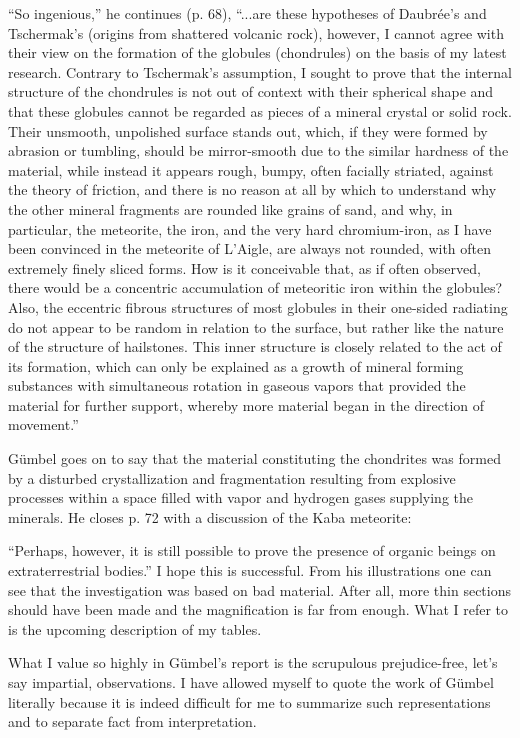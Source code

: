 \documentclass[a4paper, 11pt, oneside]{article}
\begin{document}
``So ingenious,'' he continues (p. 68), ``...are these hypotheses of Daubrée's and Tschermak's (origins from shattered volcanic rock), however, I cannot agree with their view on the formation of the globules (chondrules) on the basis of my latest research. Contrary to Tschermak's assumption, I sought to prove that the internal structure of the chondrules is not out of context with their spherical shape and that these globules cannot be regarded as pieces of a mineral crystal or solid rock. Their unsmooth, unpolished surface stands out, which, if they were formed by abrasion or tumbling, should be mirror-smooth due to the similar hardness of the material, while instead it appears rough, bumpy, often facially striated, against the theory of friction, and there is no reason at all by which to understand why the other mineral fragments are rounded like grains of sand, and why, in particular, the meteorite, the iron, and the very hard chromium-iron, as I have been convinced in the meteorite of L'Aigle, are always not rounded, with often extremely finely sliced forms. How is it conceivable that, as if often observed, there would be a concentric accumulation of meteoritic iron within the globules? Also, the eccentric fibrous structures of most globules in their one-sided radiating do not appear to be random in relation to the surface, but rather like the nature of the structure of hailstones. This inner structure is closely related to the act of its formation, which can only be explained as a growth of mineral forming substances with simultaneous rotation in gaseous vapors that provided the material for further support, whereby more material began in the direction of movement.''

Gümbel goes on to say that the material constituting the chondrites was formed by a disturbed crystallization and fragmentation resulting from explosive processes within a space filled with vapor and hydrogen gases supplying the minerals. He closes p. 72 with a discussion of the Kaba meteorite:

``Perhaps, however, it is still possible to prove the presence of organic beings on extraterrestrial bodies.'' I hope this is successful. From his illustrations one can see that the investigation was based on bad material. After all, more thin sections should have been made and the magnification is far from enough. What I refer to is the upcoming description of my tables.

What I value so highly in Gümbel's report is the scrupulous prejudice-free, let's say impartial, observations. I have allowed myself to quote the work of Gümbel literally because it is indeed difficult for me to summarize such representations and to separate fact from interpretation.
\end{document}
